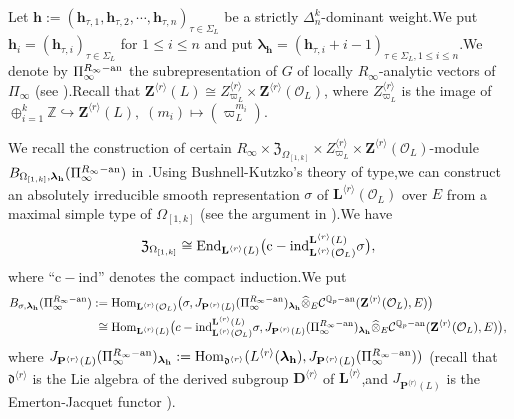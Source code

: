 \documentclass[SecEq,CM,GP]{degruyter-crelle} %
\theoremstyle{plain}
\newcommand{\ana}{{\rm an}}
\newcommand{\EndO}{{\rm End}}
\newcommand{\homo}{{\rm Hom}}
\newcommand{\hpi}{{{\mathbf{h}}}}
\newcommand{\lrr}{{\langle r\rangle}}
\newcommand{\omepik}{\Omega_{[1,k]}}
\newcommand{\BQ}{{\mathbb{Q}}}
\newcommand{\BZ}{{\mathbb{Z}}}
\newcommand{\bD}{{\mathbf{D}}}
\newcommand{\bL}{{\mathbf{L}}}
\newcommand{\bP}{{\mathbf{P}}}
\newcommand{\bZ}{{\mathbf{Z}}}
\newcommand{\bh}{{\mathbf{h}}}
\newcommand{\cC}{\mathcal C}
\newcommand{\cO}{\mathcal O}
\newcommand{\FZ}{{\mathfrak{Z}}}
\newcommand{\fd}{{\mathfrak{d}}}
\begin{document}


Let $\bh:=(\hpi_{\tau,1},\hpi_{\tau,2},\cdots,\hpi_{\tau,n} )_{\tau\in \Sigma_L}$ be a strictly $\Delta_n^k$-dominant weight.\;We put $\hpi_{i}=(\hpi_{\tau,i})_{\tau\in \Sigma_L}$ for $1\leq i\leq n$ and put ${\bm\lambda}_\bh=(\hpi_{\tau,i}+i-1)_{\tau\in \Sigma_L,1\leq i\leq n}$.\;We denote by $\Pi_\infty^{R_\infty-\ana}$ the subrepresentation of $G$ of locally $R_\infty$-analytic vectors of $\Pi_\infty$ (see \cite[Section 3.1]{breuil2017interpretation}).\;Recall that $\bZ^{\lrr}(L)\cong Z^{\lrr}_{\varpi_L}\times \bZ^{\lrr}(\cO_L)$, where 
$Z^{\lrr}_{\varpi_L}$ is the image of $\oplus_{i=1}^k\BZ\hookrightarrow \bZ^{\lrr}(L),\;(m_i)\mapsto (\varpi_L^{m_i})$.\;

We recall the construction of certain  $R_{\infty}\times\FZ_{\omepik}\times Z^{\lrr}_{\varpi_L}\times \bZ^{\lrr}(\cO_L)$-module $B_{\omepik,{\bm\lambda}_\bh}(\Pi_\infty^{R_\infty-\ana})$ in \cite[Sections  3.1.1,.2,]{Ding2021}.\;Using Bushnell-Kutzko's theory of type,\;we can construct an absolutely irreducible smooth representation $\sigma$ of $\bL^{\lrr}(\cO_L)$ over $E$ from a maximal simple type of $\omepik$ (see the argument in \cite[Sections 3.1.1]{Ding2021}).\;We have $$\FZ_{\omepik}\cong \EndO_{\bL^{\lrr}(L)}\big(\mathrm{c-ind}_{\bL^{\lrr}(\cO_L)}^{\bL^{\lrr}(L)}\sigma\big),\;$$where ``$\mathrm{c-ind}$'' denotes the compact induction.\;We put 
\begin{equation*}
\begin{aligned}
	B_{\sigma,{\bm\lambda}_\bh}(\Pi_\infty^{R_\infty-\ana}):=&\;\homo_{\bL^{\lrr}(\cO_L)}\big(\sigma,J_{\bP^{\lrr}(L)}(\Pi_\infty^{R_\infty-\ana})_{{\bm\lambda}_\bh}\widehat{\otimes}_E\cC^{\BQ_p-\ana}(\bZ^{\lrr}(\cO_L),E)\big)\\
	\cong &\; \homo_{\bL^{\lrr}(L)}\big(c-\mathrm{ind}_{\bL^{\lrr}(\cO_L)}^{\bL^{\lrr}(L)}\sigma,J_{\bP^{\lrr}(L)}(\Pi_\infty^{R_\infty-\ana})_{{\bm\lambda}_\bh}\widehat{\otimes}_E\cC^{\BQ_p-\ana}(\bZ^{\lrr}(\cO_L),E)\big),\;
\end{aligned}
\end{equation*}
where $J_{\bP^{\lrr}(L)}(\Pi_\infty^{R_\infty-\ana})_{{\bm\lambda}_\bh}:=\homo_{\fd^{\lrr}}(L^{\lrr}({\bm\lambda}_\bh),J_{\bP^{\lrr}(L)}(\Pi_\infty^{R_\infty-\ana}))$ (recall that $\fd^{\lrr}$ is the Lie algebra of the derived subgroup $\bD^{\lrr}$ of $\bL^{\lrr}$,\;and $J_{\bP^{\lrr}(L)}$ is the Emerton-Jacquet functor \cite{emerton2006jacquet}).
\end{document}
